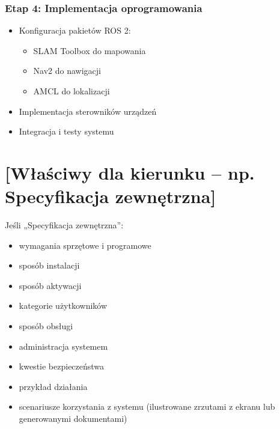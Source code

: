 \documentclass[a4paper,twoside,12pt]{book}
\begin{document}
\subsection{Etap 4: Implementacja oprogramowania}
\begin{itemize}
\item Konfiguracja pakietów ROS 2:
	\begin{itemize}
	\item SLAM Toolbox do mapowania
	\item Nav2 do nawigacji
	\item AMCL do lokalizacji
	\end{itemize}
\item Implementacja sterowników urządzeń
\item Integracja i testy systemu
\end{itemize}



\chapter{[Właściwy dla kierunku -- np. Specyfikacja zewnętrzna]}
\label{ch:04}

Jeśli „Specyfikacja zewnętrzna”:
\begin{itemize}
\item  wymagania sprzętowe i programowe
\item  sposób instalacji
\item  sposób aktywacji
\item  kategorie użytkowników
\item  sposób obsługi
\item  administracja systemem
\item  kwestie bezpieczeństwa
\item  przykład działania
\item  scenariusze korzystania z systemu (ilustrowane zrzutami z ekranu lub generowanymi dokumentami)
\end{itemize}
\end{document}
